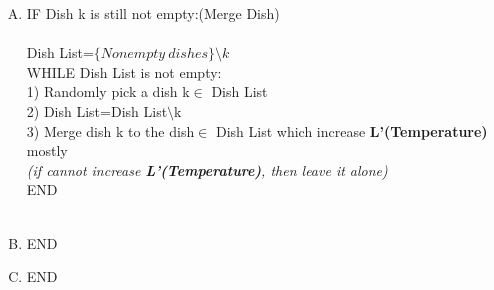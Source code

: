 \documentclass{article}
\begin{document}
\begin{spacing}{1.1}
\begin{enumerate}[(A)]
ii) Find the best approximated Reallocation of word w:\\
$\Delta L$=0;\\ 
FOR kkk=find(Promising Dish==max(Promising Dish)):\\ \\
a)Naive Reallocation:\\
For j=Same Restaurant(kkk)\\
Assign all of words w from the table serving dish k to the table serving dish kkk\\
END\\
Calculate the change of L between present config and previous config:$l_{0}$
b)Gready Search:\\
$\Delta l$=1\\
WHILE $\Delta l>$0\\
$\Delta l_k$=$\Delta K$(assign one word w from dish kkk back to dish k)\\
$\Delta l_t$=max($\Delta T$(assign one word w from dish kkk back to dish k in Restaurant j$\in$Same Restaurant(kkk)))\\
$\Delta l=\Delta l_k+\Delta l_t$\\
END\\
$\Delta L=max(\Delta L,l_{0}+\Delta l)$\\
END\\ \\
iii)Decision:\\
IF $\Delta L>$0\\
Accept new config\\
ELSE\\
Restore previous config\\
END\\ \\
END
\item IF Dish k is still not empty:(Merge Dish)\\ \\
 Dish List=$\{Nonempty \ dishes\}\setminus k$\\ 
 WHILE Dish List is not empty:\\
 1) Randomly pick a dish k$\in$ Dish List\\
 2) Dish List=Dish List$\setminus$k\\
 3) Merge dish k to the dish$\in$ Dish List which increase {\bf L'(Temperature)} mostly\\
\small{\emph{(if cannot increase {\bf L'(Temperature)}, then leave it alone)}}\\
 END\\ \\
\item END
\item END
\end{enumerate}

\end{spacing}
\end{document}
